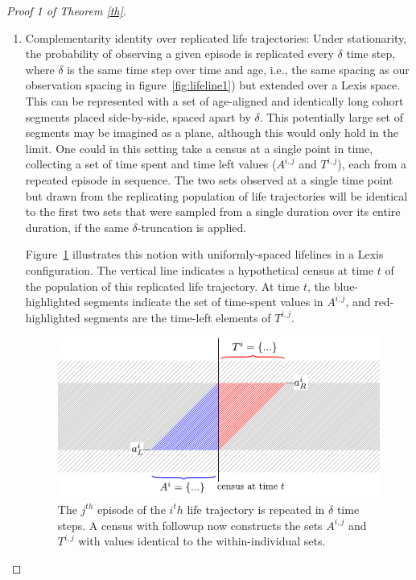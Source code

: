 \documentclass[12pt,oneside,a4paper]{article}
\theoremstyle{definition}
\newcommand{\vb}[1]{\texttt{#1}}
\begin{document}
\begin{proof}[Proof 1 of Theorem \ref{th}]
\begin{enumerate}
For example, from the  life trajectory in Tab.~\ref{tab:traj}, \vb{HSSH}, sickness might be the state of interest, in which case \vb{SS} becomes the episode of interest in this trajectory. If each time step is a year, $\delta = 1$, then we have $A^{21,1} = \{ 0,1,2 \}$ and $T^{21,1} = \{ 2,1,0 \}$: Where order does not matter, these are two equal sets.

\FloatBarrier
\item{Complementarity identity over replicated life trajectories:} Under stationarity, the probability of observing a given episode is replicated every $\delta$ time step, where $\delta$ is the same time step over time and age, i.e., the same spacing as our observation spacing in figure~\ref{fig:lifeline1}) but extended over a
Lexis space. This can be represented with a set of age-aligned and identically long cohort segments placed side-by-side, spaced apart by $\delta$.
This potentially large set of segments may be imagined as a plane, although this
would only hold in the limit.
One could in this setting take a census at a single point in time, collecting a set of
time spent and time left values ($A^{i,j}$ and $T^{i,j}$), each from a repeated episode in
sequence.
The two sets observed at a single time point but drawn from the replicating population of life trajectories will be identical to the first two sets that were sampled from
a single duration over its entire duration, if the same $\delta$-truncation is applied.

Figure~\ref{fig:clones} illustrates this notion with uniformly-spaced lifelines
in a Lexis configuration. The vertical line indicates a hypothetical census at time $t$ of
the population of this replicated life trajectory. At time $t$, the blue-highlighted segments indicate
the set of time-spent values in $A^{i,j}$, and red-highlighted segments are the
time-left elements of $T^{i,j}$. 

 \begin{figure}[h!]
\centering
\caption{The $j^{th}$ episode of the $i^th$ life trajectory is repeated in $\delta$ time steps. A
census with followup now constructs the sets $A^{i,j}$ and $T^{i,j}$ with values
identical to the within-individual sets.}
\label{fig:clones}
\includegraphics[scale=.8]{Figures/lifelinerepeated.pdf}
\end{figure}


\end{enumerate}
\end{proof}
\end{document}
